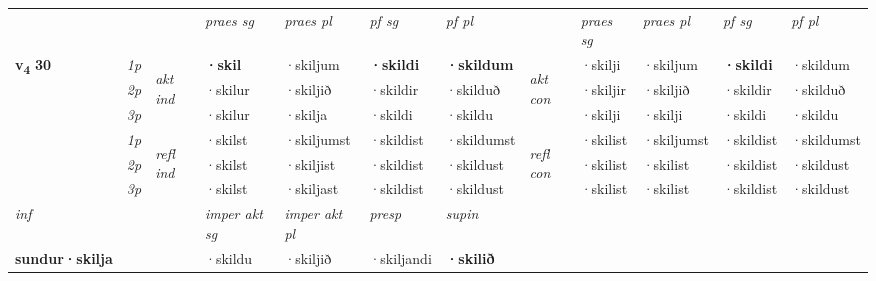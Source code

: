 \begin{longtable}[l]{X>{\footnotesize\itshape}llXXXXlXXXX}
 & &   & \textit{praes sg}  & \textit{praes pl}    & \textit{ pf sg} & \textit{pf pl} & & \textit{praes sg}  & \textit{praes pl}    & \textit{pf sg} & \textit{pf pl }  \\ \cmidrule{4-7} \cmidrule{9-12}
 \multirow{2}{*}{{{\textbf{v{\textsubscript{4}}} \Large{\textbf{30}}}}}  & 1p & \multirow{3}{*}{\begin{turn}{90}\textit{akt ind}\end{turn}} & \textbf{·skil} & ·skiljum & \textbf{·skildi} & \textbf{·skildum} & \multirow{3}{*}{\begin{turn}{90}\textit{akt con}\end{turn}} &·skilji & ·skiljum & \textbf{·skildi} & ·skildum\\*
 & 2p &  &  ·skilur  & ·skiljið & ·skildir & ·skilduð & & ·skiljir & ·skiljið & ·skildir & ·skilduð \\*
 & 3p &  & ·skilur & ·skilja & ·skildi & ·skildu & & ·skilji & ·skilji& ·skildi & ·skildu \\*
\cmidrule{4-7} \cmidrule{9-12}
 & 1p & \multirow{3}{*}{\begin{turn}{90}\textit{refl ind}\end{turn}}  & ·skilst & ·skiljumst & ·skildist & ·skildumst & \multirow{3}{*}{\begin{turn}{90}\textit{refl con}\end{turn}}  &·skilist & ·skiljumst & ·skildist & ·skildumst \\*
 & 2p &  & ·skilst & ·skiljist & ·skildist & ·skildust & &·skilist & ·skilist & ·skildist & ·skildust \\*
 & 3p  & & ·skilst & ·skiljast & ·skildist & ·skildust & & ·skilist & ·skilist& ·skildist & ·skildust \\*
\cmidrule{4-7} \cmidrule{9-12}

   {\textit{inf}} & &  & \textit{imper akt sg} & \textit{imper akt pl}   & \textit{presp} & \textit{supin}   \\*
  {\textbf{sundur\allowbreak ·skilja}} & && ·skildu  & ·skiljið   & ·skiljandi &  \textbf{·skilið}   \\*

\midrule


\end{longtable}
